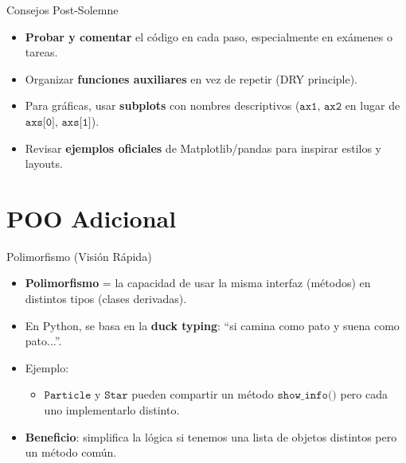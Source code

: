 \documentclass[10pt]{beamer}
\begin{document}
\begin{frame}{Consejos Post-Solemne}
  \begin{itemize}
    \item \textbf{Probar y comentar} el código en cada paso, especialmente en exámenes o tareas.
    \item Organizar \textbf{funciones auxiliares} en vez de repetir (DRY principle).
    \item Para gráficas, usar \textbf{subplots} con nombres descriptivos (\(\texttt{ax1, ax2}\) en lugar de \(\texttt{axs[0], axs[1]}\)).
    \item Revisar \textbf{ejemplos oficiales} de Matplotlib/pandas para inspirar estilos y layouts.
  \end{itemize}
\end{frame}

\section{POO Adicional}

\begin{frame}{Polimorfismo (Visión Rápida)}
  \begin{itemize}
    \item \textbf{Polimorfismo} = la capacidad de usar la misma interfaz (métodos) en distintos tipos (clases derivadas).
    \item En Python, se basa en la \textbf{duck typing}: “si camina como pato y suena como pato...”.
    \item Ejemplo:
      \begin{itemize}
        \item \(\texttt{Particle}\) y \(\texttt{Star}\) pueden compartir un método \(\texttt{show\_info()}\) pero cada uno implementarlo distinto.
      \end{itemize}
    \item \textbf{Beneficio}: simplifica la lógica si tenemos una lista de objetos distintos pero un método común.
  \end{itemize}
\end{frame}
\end{document}
